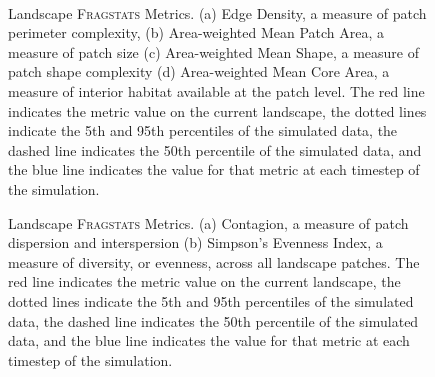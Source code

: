 
\begin{figure}[!htbp]
  \centering
   \\
\caption{Landscape \textsc{Fragstats} Metrics. (a) Edge Density, a measure of patch perimeter complexity, (b) Area-weighted Mean Patch Area, a measure of patch size (c) Area-weighted Mean Shape, a measure of patch shape complexity (d) Area-weighted Mean Core Area, a measure of interior habitat available at the patch level. The red line indicates the metric value on the current landscape, the dotted lines indicate the 5th and 95th percentiles of the simulated data, the dashed line indicates the 50th percentile of the simulated data, and the blue line indicates the value for that metric at each timestep of the simulation.}
\label{fig:fragland1}
\end{figure}

\begin{figure}[!htbp]
  \centering
\caption{Landscape \textsc{Fragstats} Metrics. (a) Contagion, a measure of patch dispersion and interspersion (b) Simpson's Evenness Index, a measure of diversity, or evenness, across all landscape patches. The red line indicates the metric value on the current landscape, the dotted lines indicate the 5th and 95th percentiles of the simulated data, the dashed line indicates the 50th percentile of the simulated data, and the blue line indicates the value for that metric at each timestep of the simulation.}
\label{fig:fragland2}
\end{figure}


